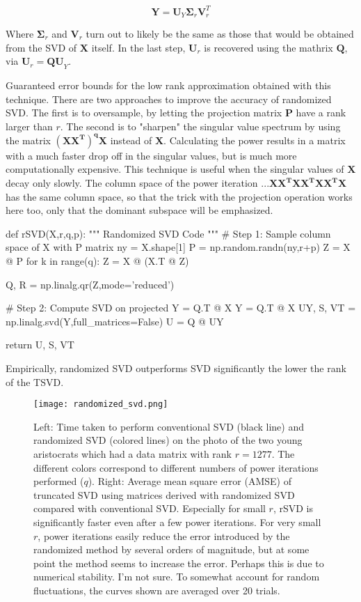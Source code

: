 \begin{equation}
\mathbf{Y} = \mathbf{U}_Y\mathbf{\Sigma}_r\mathbf{V}_r^T
\end{equation}

Where $\mathbf{\Sigma}_r$ and $\mathbf{V}_r$ turn out to likely be the same as those that would be obtained from the SVD of $\mathbf{X}$ itself. In the last step, $\mathbf{U}_r$ is recovered using the mathrix $\mathbf{Q}$, via $\mathbf{U}_r = \mathbf{QU}_Y$. 

Guaranteed error bounds for the low rank approximation obtained with this technique. There are two approaches to improve the accuracy of randomized SVD. The first is to oversample, by letting the projection matrix $\mathbf{P}$ have a rank larger than $r$. The second is to "sharpen" the singular value spectrum by using the matrix $\mathbf{(X X^T)^q X }$ instead of $\mathbf{X}$. Calculating the power results in a matrix with a much faster drop off in the singular values, but is much more computationally expensive. This technique is useful when the singular values of $\mathbf{X}$ decay only slowly. The column space of the power iteration $\mathbf{...X X^T X X^T X X^T X}$ has the same column space, so that the trick with the projection operation works here too, only that the dominant subspace will be emphasized.\\


\begin{python}
def rSVD(X,r,q,p):
    """
    Randomized SVD Code
    """
    # Step 1: Sample column space of X with P matrix
    ny = X.shape[1]
    P = np.random.randn(ny,r+p)
    Z = X @ P
    for k in range(q):
        Z = X @ (X.T @ Z)

    Q, R = np.linalg.qr(Z,mode='reduced')

    # Step 2: Compute SVD on projected Y = Q.T @ X
    Y = Q.T @ X
    UY, S, VT = np.linalg.svd(Y,full_matrices=False)
    U = Q @ UY

    return U, S, VT
\end{python}

Empirically, randomized SVD outperforms SVD significantly the lower the rank of the TSVD.


\begin{figure}
\centering
    \texttt{[image: randomized\_svd.png]}
    \caption{Left: Time taken to perform conventional SVD (black line) and randomized SVD (colored lines) on the photo of the two young aristocrats which had a data matrix with rank $r=1277$. The different colors correspond to different numbers of power iterations performed ($q$). Right: Average mean square error (AMSE) of truncated SVD using matrices derived with randomized SVD compared with conventional SVD. Especially for small $r$, rSVD is significantly faster even after a few power iterations. For very small $r$, power iterations easily reduce the error introduced by the randomized method by several orders of magnitude, but at some point the method seems to increase the error. Perhaps this is due to numerical stability. I'm not sure. To somewhat account for random fluctuations, the curves shown are averaged over 20 trials.}
    \label{fig:svd_scree}
\end{figure}